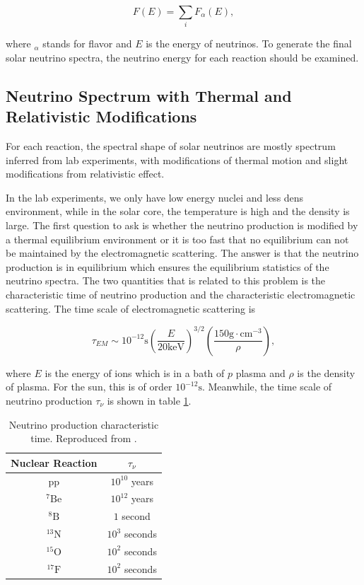 \documentclass[%
 aip,
 jmp,%
 amsmath,amssymb,
 reprint,%
]{revtex4-1}
\begin{document}
\begin{equation}
F(E) = \sum_i F_\alpha (E),
\end{equation}

where ${}_{\alpha}$ stands for flavor and $E$ is the energy of neutrinos. To generate the final solar neutrino spectra, the neutrino energy for each reaction should be examined.

\subsection{Neutrino Spectrum with Thermal and Relativistic Modifications}

For each reaction, the spectral shape of solar neutrinos are mostly spectrum inferred from lab experiments, with modifications of thermal motion and slight modifications from relativistic effect.\cite{Bahcall1991} 

In the lab experiments, we only have low energy nuclei and less dens environment, while in the solar core, the temperature is high and the density is large. The first question to ask is whether the neutrino production is modified by a thermal equilibrium environment or it is too fast that no equilibrium can not be maintained by the electromagnetic scattering. The answer is that the neutrino production is in equilibrium which ensures the equilibrium statistics of the neutrino spectra.\cite{Bahcall1991} The two quantities that is related to this problem is the characteristic time of neutrino production and the characteristic electromagnetic scattering. The time scale of electromagnetic scattering is \cite{Bahcall1991}

\begin{equation}
\tau_{EM} \sim 10^{-12} \mathrm{s} \left( \frac{E}{20\mathrm{keV}} \right)^{3/2}\left( \frac{150 \mathrm{g \cdot cm^{-3}} }{\rho} \right),
\end{equation}

where $E$ is the energy of ions which is in a bath of $p$ plasma and $\rho$ is the density of plasma. For the sun, this is of order $10^{-12}\mathrm{s}$. Meanwhile, the time scale of neutrino production $\tau_{\nu}$ is shown in table \ref{tab:neutrino_production_characteristic_time}.


\begin{table}[ht]
\centering
\begin{tabular}{|c|c|}
\hline
 Nuclear Reaction &  $\tau_{\nu}$ \\
 \hline
pp  & $10^{10}$ years \\
$\mathrm{ {}^7Be }$ & $10^{12}$ years \\
$\mathrm{ {}^8B }$ & $1$ second \\
$\mathrm{ {}^{13}N }$ & $10^3$ seconds \\
$\mathrm{ {}^{15}O }$ & $10^2$ seconds \\
$\mathrm{ {}^{17}F }$ & $10^2$ seconds\\
\hline
\end{tabular}
\caption{Neutrino production characteristic time. Reproduced from \cite{Bahcall1991}.}
\label{tab:neutrino_production_characteristic_time}
\end{table}
\end{document}

